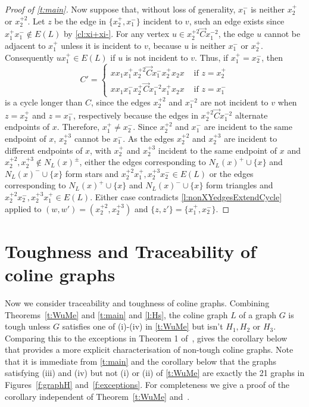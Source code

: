 \documentclass[12pt]{article}
\theoremstyle{definition}
\newcommand{\ora}{\overrightarrow{C}}
\begin{document}
\begin{proof}[Proof of \cref{t:main}]
Now suppose that, without loss of generality, $x_1^-$ is neither $ x_2^+$ or $x_2^{+2}$.
Let $z$ be the edge in $\{x_2^+,x_1^-\}$ incident to $v$, such an edge exists since $x_1^+ x_1^- \notin E(L)$ by \cref{cl:xi+xi-}. For any vertex $u \in x_2^{+2}\ora x_1^{-2}$, the edge $u$ cannot be adjacent to $x_1^+$ unless it is incident to $v$, because $u$ is neither $x_1^-$ or $x_2^+$. Consequently $u x_1^+ \in E(L)$ if $u$ is not incident to $v$. Thus, if $x_1^+ =x_2^-$, then 
\[
C' = 
\begin{cases}
 x x_1 x_1^+ x_2^{+2} \ora x_1^- x_2^+ x_2 x &\text{ if } z =x_2^+\\
 x x_1 x_1^- x_2^{+} \ora x_1^{-2} x_1^+ x_2 x &\text{ if } z =x_1^-
\end{cases}
\]
is a cycle longer than $C$, since the edges $x_2^{+2}$ and $x_1^{-2}$ are not incident to $v$ when $z=x_2^+$ and $z=x_1^{-}$, respectively because the edges in $x_2^{+2}\ora x_1^{-2}$ alternate endpoints of $x$. 
Therefore, $x_1^+ \neq x_2^-$.
Since $x_2^{+2}$ and $x_1^-$ are incident to the same endpoint of $x$, $x_2^{+3}$ cannot be $ x_1^-$. As the edges $x_2^{+2}$ and $x_{2}^{+3}$ are incident to different endpoints of $x$, with $x_2^+$ and $x_{2}^{+3}$ incident to the same endpoint of $x$ and $x_2^{+2},x_2^{+3} \notin N_L(x)^\pm$, either the edges corresponding to $N_L(x)^+\cup \{x\}$ and $N_L(x)^-\cup \{x\}$ form stars and $x_2^{+2} x_{1}^+  , x_2^{+3} x_2^- \in E(L)$ or the edges corresponding to $N_L(x)^+\cup \{x\}$ and $N_L(x)^-\cup \{x\}$ form triangles and $x_2^{+2} x_{2}^-  , x_2^{+3} x_{1}^+ \in E(L)$.
Either case contradicts \cref{l:nonXYedgesExtendCycle} applied to  $(w,w')=(x_2^{+2},x_2^{+3})$ and $\{z,z'\} = \{x_1^+,x_2^-\}$.
\end{proof}

\section{Toughness and Traceability of coline graphs}\label{s:TNT}
Now we consider traceability and toughness of coline graphs.
Combining Theorems~\ref{t:WuMe} and \ref{t:main} and \cref{l:Hs}, the coline graph $L$ of a graph $G$ is tough unless $G$ satisfies one of (i)-(iv) in \cref{t:WuMe} but isn't $H_1, H_2$ or $H_3$. Comparing this to the exceptions in Theorem 1 of~\cite{Li05}, gives the corollary below that provides a more explicit characterisation of non-tough coline graphs. Note that it is immediate from \cref{t:main} and the corollary below that the graphs satisfying (iii) and (iv) but not (i) or (ii) of \cref{t:WuMe} are exactly the 21 graphs in Figures~\ref{f:graphH} and~\ref{f:exceptions}. For completeness we give a proof of the corollary independent of Theorem~\ref{t:WuMe} and~\cite{Li05}.
\end{document}
